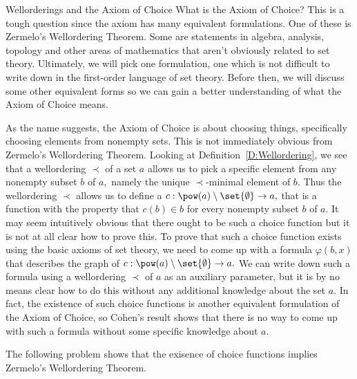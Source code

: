 \begin{unit}{Wellorderings and the Axiom of Choice}
What is the Axiom of Choice?
This is a tough question since the axiom has many equivalent formulations.
One of these is Zermelo's Wellordering Theorem.
Some are statements in algebra, analysis, topology and other areas of mathematics that aren't obviously related to set theory.
Ultimately, we will pick one formulation, one which is not difficult to write down in the first-order language of set theory.
Before then, we will discuss some other equivalent forms so we can gain a better understanding of what the Axiom of Choice means.

As the name suggests, the Axiom of Choice is about choosing things, specifically choosing elements from nonempty sets.
This is not immediately obvious from Zermelo's Wellordering Theorem.
Looking at Definition~\ref{D:Wellordering}, we see that a wellordering \({\prec}\) of a set \(a\) allows us to pick a specific element from any nonempty subset \(b\) of \(a,\) namely the unique \({\prec}\)-minimal element of \(b.\)
Thus the wellordering \({\prec}\) allows us to define a  \(c:\pow(a)\setminus\set{\emptyset}\to a,\) that is a function with the property that \(c(b) \in b\) for every nonempty subset \(b\) of \(a.\)
It may seem intuitively obvious that there ought to be such a choice function but it is not at all clear how to prove this.
To prove that such a choice function exists using the basic axioms of set theory, we need to come up with a formula \(\varphi(b,x)\) that describes the graph of \(c:\pow(a)\setminus\set{\emptyset}\to a.\)
We can write down such a formula using a wellordering \({\prec}\) of \(a\) as an auxiliary parameter, but it is by no means clear how to do this without any additional knowledge about the set \(a.\)
In fact, the existence of such choice functions is another equivalent formulation of the Axiom of Choice, so Cohen's result shows that there is no way to come up with such a formula without some specific knowledge about \(a.\)

The following problem shows that the exisence of choice functions implies Zermelo's Wellordering Theorem.


\end{unit}
